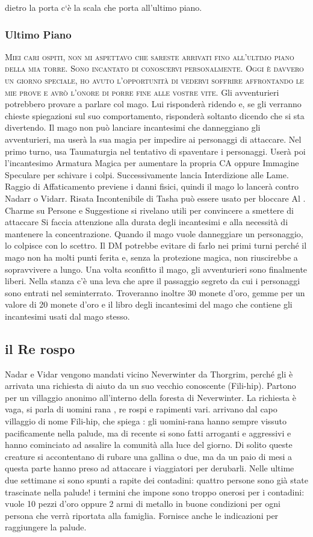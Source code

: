 \documentclass{article}
\begin{document}
    dietro la porta c`è la scala che porta all'ultimo piano.
\subsubsection{Ultimo Piano}
\textsc{Miei cari ospiti, non mi aspettavo che sareste arrivati fino
all'ultimo piano della mia torre. Sono incantato di conoscervi
personalmente. Oggi è davvero un giorno speciale, ho avuto
l'opportunità di vedervi soffrire affrontando le mie prove e
avrò l'onore di porre fine alle vostre vite.}
Gli avventurieri
potrebbero provare a parlare col mago. Lui risponderà
ridendo e, se gli verranno chieste spiegazioni sul suo
comportamento, risponderà soltanto dicendo che si sta
divertendo.
Il mago non può lanciare incantesimi che danneggiano gli
avventurieri, ma userà la sua magia per impedire ai
personaggi di attaccare. Nel primo turno, usa Taumaturgia
nel tentativo di spaventare i personaggi.
Userà poi l'incantesimo Armatura Magica per aumentare la
propria CA oppure Immagine Speculare per schivare i colpi.
Successivamente lancia Interdizione alle Lame. Raggio di
Affaticamento previene i danni fisici, quindi il mago lo lancerà
contro Nadarr o Vidarr.
Risata Incontenibile di Tasha può essere usato per
bloccare Al . Charme su
Persone e Suggestione si rivelano utili per convincere a smettere di attaccare Si faccia attenzione alla durata degli incantesimi e alla
necessità di mantenere la concentrazione. Quando il mago
vuole danneggiare un personaggio, lo colpisce con lo scettro.
Il DM potrebbe evitare di farlo nei primi turni perché il mago
non ha molti punti ferita e, senza la protezione magica, non
riuscirebbe a sopravvivere a lungo.
Una volta sconfitto il mago, gli avventurieri sono
finalmente liberi. Nella stanza c'è una leva che apre il
passaggio segreto da cui i personaggi sono entrati nel
seminterrato. Troveranno inoltre 30 monete d'oro, gemme
per un valore di 20 monete d'oro e il libro degli incantesimi
del mago che contiene gli incantesimi usati dal mago stesso.

\subsection{il Re rospo} Nadar e Vidar vengono mandati vicino Neverwinter da Thorgrim, perché gli è arrivata una richiesta di aiuto da un suo vecchio conoscente (Fili-hip). Partono per un villaggio anonimo all'interno della foresta di Neverwinter. La richiesta è vaga, si parla di uomini rana , re rospi e rapimenti vari.  arrivano dal capo villaggio di nome Fili-hip, che spiega : gli uomini-rana hanno sempre vissuto pacificamente nella palude, ma di recente si sono fatti arroganti e aggressivi e hanno cominciato ad assalire la comunità alla luce del giorno. Di solito queste creature si accontentano di rubare una gallina o due, ma da un paio di mesi a questa parte hanno preso ad attaccare i viaggiatori per derubarli. Nelle ultime due settimane si sono spunti a rapite dei contadini: quattro persone sono già state trascinate nella palude!  i termini che impone sono troppo onerosi per i contadini: vuole 10 pezzi d’oro oppure 2 armi di metallo in buone condizioni per ogni persona che verrà riportata alla famiglia. Fornisce anche le indicazioni per raggiungere la palude. 
\end{document}
